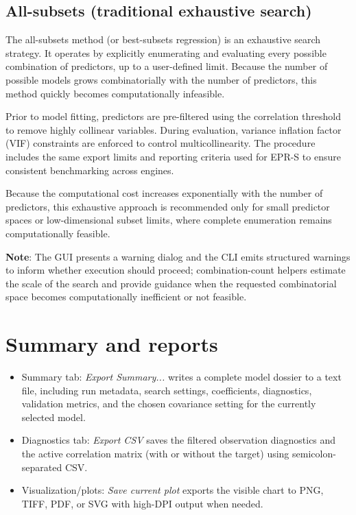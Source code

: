 \documentclass[11pt,a4paper]{article}
\begin{document}
\subsection{All-subsets (traditional exhaustive search)}

The all-subsets method (or best-subsets regression) is an exhaustive search strategy. It operates by explicitly enumerating and evaluating every possible combination of predictors, up to a user-defined limit. Because the number of possible models grows combinatorially with the number of predictors, this method quickly becomes computationally infeasible.

Prior to model fitting, predictors are pre-filtered using the correlation threshold to remove highly collinear variables. During evaluation, variance inflation factor (VIF) constraints are enforced to control multicollinearity. The procedure includes the same export limits and reporting criteria used for EPR-S to ensure consistent benchmarking across engines.

Because the computational cost increases exponentially with the number of predictors, this exhaustive approach is recommended only for small predictor spaces or low-dimensional subset limits, where complete enumeration remains computationally feasible.

\medskip
\noindent \textbf{Note}: The GUI presents a warning dialog and the CLI emits structured warnings to inform whether execution should proceed; combination-count helpers estimate the scale of the search and provide guidance when the requested combinatorial space becomes computationally inefficient or not feasible.


\section{Summary and reports}
\begin{itemize}
  \item Summary tab: \emph{Export Summary...} writes a complete model dossier to a text file, including run metadata, search settings, coefficients, diagnostics, validation metrics, and the chosen covariance setting for the currently selected model.
  \item Diagnostics tab: \emph{Export CSV} saves the filtered observation diagnostics and the active correlation matrix (with or without the target) using semicolon-separated CSV.
  \item Visualization/plots: \emph{Save current plot} exports the visible chart to PNG, TIFF, PDF, or SVG with high-DPI output when needed.
\end{itemize}
\end{document}
